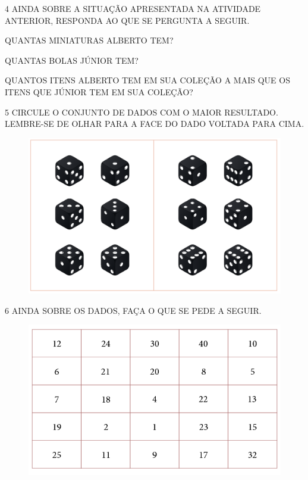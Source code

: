 \num{4} AINDA SOBRE A SITUAÇÃO APRESENTADA NA ATIVIDADE ANTERIOR, RESPONDA AO QUE SE PERGUNTA A SEGUIR.

\begin{escolha}
\item
  QUANTAS MINIATURAS ALBERTO TEM?\\

\item
  QUANTAS BOLAS JÚNIOR TEM?\\

\item
  QUANTOS ITENS ALBERTO TEM EM SUA COLEÇÃO A MAIS QUE OS ITENS QUE JÚNIOR TEM EM SUA COLEÇÃO?\\
\end{escolha}


\num{5} CIRCULE O CONJUNTO DE DADOS COM O MAIOR RESULTADO. LEMBRE-SE DE OLHAR PARA A FACE DO DADO VOLTADA PARA CIMA.


\begin{figure}[htpb!]
\centering
\includegraphics[width=.6\textwidth]{./media/SAEB_1ANO_MAT_FIGURA6.png}
\end{figure}


\num{6} AINDA SOBRE OS DADOS, FAÇA O QUE SE PEDE A SEGUIR.

\begin{figure}[htpb!]
\centering
\includegraphics[width=.7\textwidth]{./media/SAEB_1ANO_MAT_FIGURA7.png}
\end{figure}

